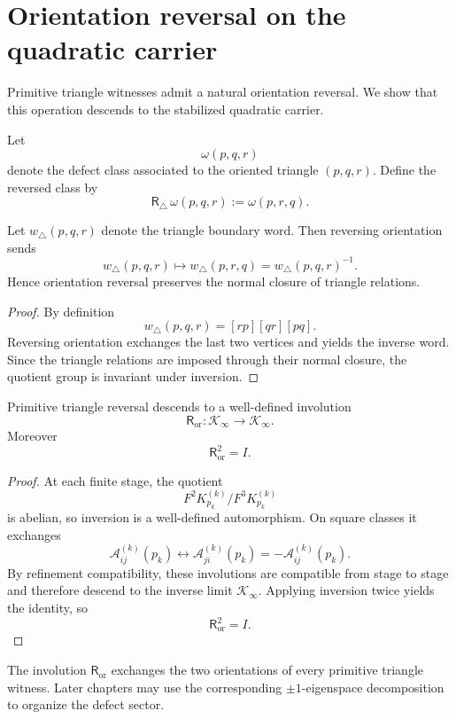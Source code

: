 \section{Orientation reversal on the quadratic carrier}
\label{sec:orientation-carrier}
Primitive triangle witnesses admit a natural orientation reversal.
We show that this operation descends to the stabilized quadratic carrier.
\begin{definition}
	Let
	\[
		\omega(p,q,r)
	\]
	denote the defect class associated to the oriented triangle
	\((p,q,r)\).
	Define the reversed class by
	\[
		\mathsf R_\triangle\,\omega(p,q,r):=\omega(p,r,q).
	\]
\end{definition}
\begin{lemma}
	Let \(w_\triangle(p,q,r)\) denote the triangle boundary word.
	Then reversing orientation sends
	\[
		w_\triangle(p,q,r)\mapsto w_\triangle(p,r,q)=w_\triangle(p,q,r)^{-1}.
	\]
	Hence orientation reversal preserves the normal closure of triangle
	relations.
\end{lemma}
\begin{proof}
	By definition
	\[
		w_\triangle(p,q,r)=[rp][qr][pq].
	\]
	Reversing orientation exchanges the last two vertices and yields the
	inverse word.
	Since the triangle relations are imposed through their normal closure,
	the quotient group is invariant under inversion.
\end{proof}
\begin{theorem}
	Primitive triangle reversal descends to a well-defined involution
	\[
		\mathsf R_{\mathrm{or}}:\mathcal K_\infty\longrightarrow \mathcal K_\infty.
	\]
	Moreover
	\[
		\mathsf R_{\mathrm{or}}^2=I.
	\]
\end{theorem}
\begin{proof}
	At each finite stage, the quotient
	\[
		F^2K_{p_k}^{(k)}/F^3K_{p_k}^{(k)}
	\]
	is abelian, so inversion is a well-defined automorphism.
	On square classes it exchanges
	\[
		\mathcal A_{ij}^{(k)}(p_k)
		\longleftrightarrow
		\mathcal A_{ji}^{(k)}(p_k)
		=
		-\mathcal A_{ij}^{(k)}(p_k).
	\]
	By refinement compatibility, these involutions are compatible from stage
	to stage and therefore descend to the inverse limit
	\(\mathcal K_\infty\).
	Applying inversion twice yields the identity, so
	\[
		\mathsf R_{\mathrm{or}}^2=I.
	\]
\end{proof}
\begin{remark}
	The involution \(\mathsf R_{\mathrm{or}}\) exchanges the two orientations of every primitive
	triangle witness.
	Later chapters may use the corresponding \(\pm1\)-eigenspace
	decomposition to organize the defect sector.
\end{remark}
